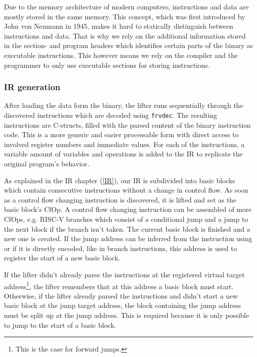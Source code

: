 \documentclass[course=eragp]{aspdoc}
\begin{document}
Due to the memory architecture of modern computers, instructions and data are mostly stored in the same
memory. This concept, which was first introduced by John von Neumann in 1945\cite{vna}, makes it
hard to statically distinguish between instructions and data. That is why we rely on the additional
information stored in the section- and program headers which identifies certain parts of the binary
as executable instructions. This however means we rely on the compiler and the programmer to only
use executable sections for storing instructions.

\subsubsection{IR generation}

After loading the data form the binary, the lifter runs sequentially through the discovered
instructions which are decoded using \texttt{frvdec}.\cite{frvdec} The resulting instructions are C-structs,
filled with the parsed content of the binary instruction code. This is a
more generic and easier processable form with direct access to involved register numbers and
immediate values. For each of the instructions, a variable amount of variables and operations is added to
the IR to replicate the original program's behavior.

\par

As explained in the IR chapter (\ref{IR}), our IR is subdivided into basic blocks which contain
consecutive instructions without a change in control flow. As soon as a control flow changing
instruction is discovered, it is lifted and set as the basic block's CfOp. A control flow changing
instruction can be assembled of more CfOps, e.g. RISC-V branches which consist of a conditional
jump and a jump to the next block if the branch isn't taken. The current basic block is finished and
a new one is created. If the jump address can be inferred from the instruction using
 or if it is directly encoded, like in branch instructions, this address is used
to register the start of a new basic block.

\par

If the lifter didn't already parse the instructions at the registered virtual target
address\footnote{This is the case for forward jumps.}, the
lifter remembers that at this address a basic block must start.
Otherwise, if the lifter already parsed the instructions and didn't start a new basic block at the
jump target address, the block containing the jump address must be split up at the jump address.
This is required because it is only possible to jump to the start of a basic block.
\end{document}
